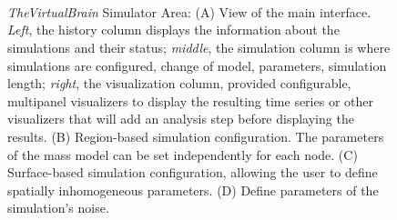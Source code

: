 \documentclass{bioinfo}
\newcommand{\TVB}{\textit{TheVirtualBrain }}
\begin{document}
		\begin{figure}[!htbp]

		\centering
			\\
			\\
			\\
			\caption{\TVB Simulator Area: 
                (A) View of the main interface. \textit{Left}, the history column displays the
                information about the simulations and their status; \textit{middle}, the
            simulation column is where simulations are configured,
            change of model, parameters, simulation length; \textit{right}, the
            visualization column, provided configurable, multipanel
            visualizers to display the resulting time series or other visualizers
            that will add an analysis step before displaying the results.  (B)
            Region-based simulation configuration. The parameters of the
            mass model can be set independently for each node.  (C) Surface-based
            simulation configuration, allowing the user to define spatially
            inhomogeneous parameters. (D) Define parameters of the simulation's noise. }
		\label{fig:simulator}
		\end{figure}
\end{document}
